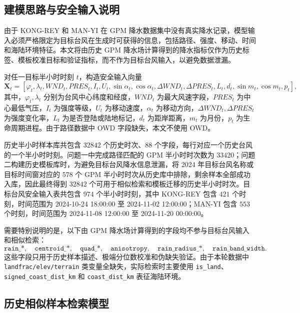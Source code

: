 \documentclass[UTF8,a4paper,zihao=5]{ctexart}
\numberwithin{equation}{section}
\numberwithin{figure}{section}
\numberwithin{table}{section}
\begin{document}
\subsection{建模思路与安全输入说明}

由于 KONG-REY 和 MAN-YI 在 GPM 降水数据集中没有真实降水记录，模型输入必须严格限定为目标台风在生成时可获得的信息，包括路径、强度、移动、时间和海陆环境特征。本文将由历史 GPM 降水场计算得到的降水指标仅作为历史标签、模板校准目标和验证指标，而不作为目标台风输入，以避免数据泄漏。

对任一目标半小时时刻 $t$，构造安全输入向量
\begin{equation}
\boldsymbol{X}_t=
\left[
\varphi_t,\lambda_t,WND_t,PRES_t,I_t,U_t,
\sin \alpha_t,\cos \alpha_t,
\Delta WND_t,\Delta PRES_t,
L_t,d_t,
\sin m_t,\cos m_t,p_t
\right],
\end{equation}
其中，$\varphi_t,\lambda_t$ 分别为台风中心纬度和经度，$WND_t$ 为最大风速字段，$PRES_t$ 为中心最低气压，$I_t$ 为强度等级，$U_t$ 为移动速度，$\alpha_t$ 为移动方向，$\Delta WND_t,\Delta PRES_t$ 为强度变化率，$L_t$ 为是否登陆或陆地标记，$d_t$ 为距岸距离，$m_t$ 为月份，$p_t$ 为生命周期进程。由于路径数据中 OWD 字段缺失，本文不使用 OWD。

历史半小时样本库共包含 $32842$ 个历史时次、$88$ 个字段，每行对应一个历史台风的一个半小时时刻。问题一中完成路径匹配的 GPM 半小时时次数为 $33420$；问题二构建历史模板库时，为避免目标台风降水信息泄漏，将 2024 年目标台风名称或目标时间窗对应的 $578$ 个 GPM 半小时时次从历史库中排除，剩余样本全部成功入库，因此最终得到 $32842$ 个可用于相似检索和模板迁移的历史半小时时次。目标台风安全输入表共包含 $974$ 个半小时时刻，其中 KONG-REY 包含 $421$ 个时刻，时间范围为 2024-10-24 18:00:00 至 2024-11-02 12:00:00；MAN-YI 包含 $553$ 个时刻，时间范围为 2024-11-08 12:00:00 至 2024-11-20 00:00:00。

需要特别说明的是，以下由 GPM 降水场计算得到的字段均不参与目标台风输入和相似检索：
\begin{equation}
\texttt{rain\_*},\quad
\texttt{centroid\_*},\quad
\texttt{quad\_*},\quad
\texttt{anisotropy},\quad
\texttt{rain\_radius\_*},\quad
\texttt{rain\_band\_width}.
\end{equation}
这些字段只用于历史样本描述、极端分位数校准和伪缺失验证。由于本轮数据中 \texttt{landfrac/elev/terrain} 类变量全缺失，实际检索时主要使用 \texttt{is\_land}、\texttt{signed\_coast\_dist\_km} 和 \texttt{coast\_dist\_km} 表征海陆环境。

\subsection{历史相似样本检索模型}
\end{document}
